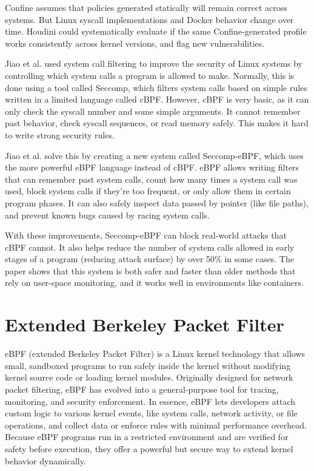 \documentclass[12pt]{report}
\begin{document}
\begin{doublespace}
Confine assumes that policies generated statically will remain correct across systems. But Linux syscall implementations and Docker behavior change over time. Houdini could systematically evaluate if the same Confine-generated profile works consistently across kernel versions, and flag new vulnerabilities.

Jiao et al. \cite{jia2023programmable} used system call filtering to improve the security of Linux systems by controlling which system calls a program is allowed to make. Normally, this is done using a tool called Seccomp, which filters system calls based on simple rules written in a limited language called cBPF. However, cBPF is very basic, as it can only check the syscall number and some simple arguments. It cannot remember past behavior, check syscall sequences, or read memory safely. This makes it hard to write strong security rules.

Jiao et al. \cite{jia2023programmable} solve this by creating a new system called Seccomp-eBPF, which uses the more powerful eBPF language instead of cBPF. eBPF allows writing filters that can remember past system calls, count how many times a system call was used, block system calls if they’re too frequent, or only allow them in certain program phases. It can also safely inspect data passed by pointer (like file paths), and prevent known bugs caused by racing system calls.

With these improvements, Seccomp-eBPF can block real-world attacks that cBPF cannot. It also helps reduce the number of system calls allowed in early stages of a program (reducing attack surface) by over 50\% in some cases. The paper shows that this system is both safer and faster than older methods that rely on user-space monitoring, and it works well in environments like containers.


\section{Extended Berkeley Packet Filter}


eBPF (extended Berkeley Packet Filter) is a Linux kernel technology that allows small, sandboxed programs to run safely inside the kernel without modifying kernel source code or loading kernel modules. Originally designed for network packet filtering, eBPF has evolved into a general-purpose tool for tracing, monitoring, and security enforcement. In essence, eBPF lets developers attach custom logic to various kernel events, like system calls, network activity, or file operations, and collect data or enforce rules with minimal performance overhead. Because eBPF programs run in a restricted environment and are verified for safety before execution, they offer a powerful but secure way to extend kernel behavior dynamically.



\end{doublespace}
\end{document}
